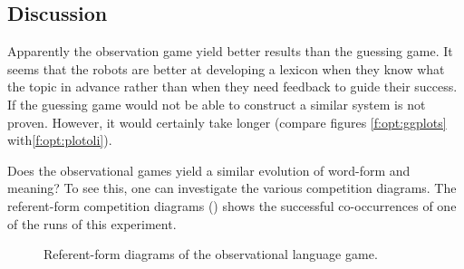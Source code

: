 \subsection{Discussion}

Apparently the observation game yield better results than the guessing game. It seems that the robots are better at developing a lexicon when they know what the topic in advance rather than when they need feedback to guide their success. If the guessing game would not be able to construct a similar system is not proven. However, it would certainly take longer (compare figures  \ref{f:opt:ggplots} with\ref{f:opt:plotoli}).

Does the observational games yield a similar evolution of word-form and meaning? To see this, one can investigate the various competition diagrams. The referent-form competition diagrams () shows the successful co-occurrences of one of the runs of this experiment. 

\begin{figure}[t]
\centering
{}
\caption{Referent-form diagrams of the observational language game.}
\label{f:opt:rfoli}
\end{figure}

